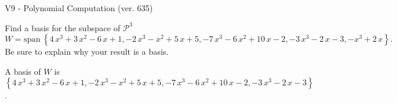 \begin{exercise}
  \begin{exerciseTitle}V9 - Polynomial Computation (ver. 635)\end{exerciseTitle}
  \begin{exerciseStatement}
    Find a basis for the subspace of \(\mathcal{P}^3\) 
\[W=\mathrm{span}\ \left\{4 \, x^{3} + 3 \, x^{2} - 6 \, x + 1 , -2 \, x^{3} - x^{2} + 5 \, x + 5 , -7 \, x^{3} - 6 \, x^{2} + 10 \, x - 2 , -3 \, x^{3} - 2 \, x - 3 , -x^{3} + 2 \, x\right\}.\]
 Be sure to explain why your result is a basis.


  \end{exerciseStatement}
  \begin{exerciseAnswer}
   A basis of \(W\) is  \(\left\{4 \, x^{3} + 3 \, x^{2} - 6 \, x + 1 , -2 \, x^{3} - x^{2} + 5 \, x + 5 , -7 \, x^{3} - 6 \, x^{2} + 10 \, x - 2 , -3 \, x^{3} - 2 \, x - 3\right\}\).
  


  \end{exerciseAnswer}
\end{exercise}
